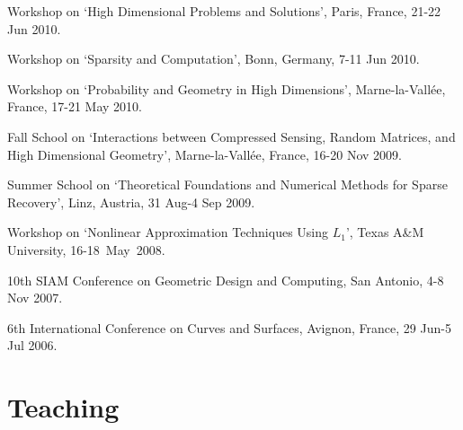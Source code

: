 \documentclass[11pt]{article}
\begin{document}
\item Workshop on `High Dimensional Problems and Solutions', Paris, France, 21-22 Jun 2010.
\item Workshop on `Sparsity and Computation', Bonn, Germany, 7-11 Jun 2010.
\item Workshop on `Probability and Geometry in High Dimensions', Marne-la-Vall\'ee, France, 17-21 May 2010.
\item Fall School on `Interactions between Compressed Sensing, Random Matrices, and High Dimensional Geometry', Marne-la-Vall\'ee, France, 16-20 Nov 2009.
\item Summer School on `Theoretical Foundations and Numerical Methods for Sparse Recovery', Linz, Austria, 31 Aug-4 Sep 2009.
\item Workshop on `Nonlinear  Approximation Techniques Using  $L_1$', Texas A\&M University, 16-18~May~2008.
\item 10th SIAM Conference on Geometric Design and Computing, San Antonio, 4-8 Nov 2007.
\item 6th International Conference on Curves and Surfaces, Avignon, France, 29 Jun-5 Jul  2006.
\eitemize


\section{Teaching}
\end{document}
